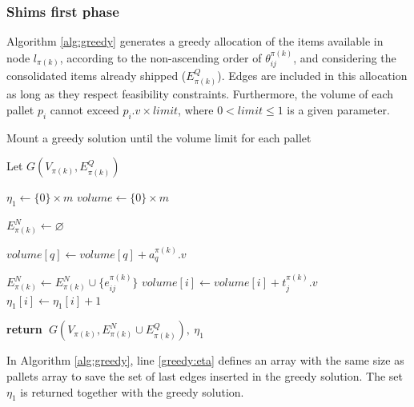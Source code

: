 \documentclass[preprint,authoryear]{elsarticle}
\renewcommand{\Return}{\State \bf {return}~}
\begin{document}
\subsubsection{Shims first phase}


Algorithm \ref{alg:greedy} generates a greedy allocation of the items available in node $l_{\pi(k)}$, according to the non-ascending order of $\theta^{\pi(k)}_{ij}$, and considering the consolidated items already shipped ($E^Q_{\pi(k)}$). Edges are included in this allocation as long as they respect feasibility constraints. Furthermore, the volume of each pallet $p_i$\/ cannot exceed $p_i.v \times limit$, where $ 0 < limit \leq 1$\/ is a given parameter.

\begin{algorithm}[H]
	\caption{Mount a greedy solution until the volume limit for each pallet}  \label{alg:greedy}
	
	\begin{algorithmic}[1]
		
		
		\State Let $G(V_{\pi(k)}, E^Q_{\pi(k)})$
		
		\State $\eta_1 \gets \{0\} \times m$ \label{greedy:eta}
		\State $volume \gets \{0\} \times m$
		
		\State $E^N_{\pi(k)} \gets \varnothing$ 			
		
		\State $volume[q] \gets volume[q] + a_q^{\pi(k)}.v$ 
		\EndIf		
		\EndFor
		
		\State $E^N_{\pi(k)} \gets E^N_{\pi(k)} \cup \{e_{ij}^{\pi(k)}\}$ 
		\State $volume[i] \gets volume[i] + t_j^{\pi(k)}.v$
		\State $\eta_1[i] \gets \eta_1[i] + 1$ 	
		\EndIf
		\EndFor
		
		\Return $G(V_{\pi(k)}, E^N_{\pi(k)} \cup E^Q_{\pi(k)}),\ \eta_1$ 
		
		\EndProcedure
		
	\end{algorithmic}
\end{algorithm}

In Algorithm \ref{alg:greedy}, line \ref{greedy:eta} defines an array with the same size as pallets array to save the set of last edges inserted in the greedy solution. The set $\eta_1$ is returned together with the greedy solution.
\end{document}
